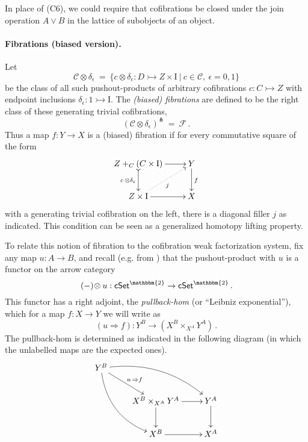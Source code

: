 \documentclass[11pt]{article}
\newcommand{\cSet}{\ensuremath{\mathsf{cSet}}}
\newcommand{\mono}{\ensuremath{\rightarrowtail}}
\newcommand{\I}{\ensuremath{\mathrm{I}}}
\newtheorem{proposition}[theorem]{Proposition}
\theoremstyle{remark}
\theoremstyle{definition}
\begin{document}
In place of (C6), we could require that cofibrations be closed under the join operation $A\vee B$ in the lattice of subobjects of an object.

\paragraph{Fibrations (biased version).}
Let 
\[
\mathcal{C}\otimes \delta_\epsilon\ =\ \{ c \otimes \delta_\epsilon : D \mono Z \times \I\ |\ c \in\mathcal{C},\ \epsilon = 0,1 \}
\]
be the class of all such pushout-products of arbitrary cofibrations $c : C \mono Z$ with endpoint inclusions $\delta_\epsilon : 1 \mono \I$.
The \emph{(biased) fibrations} are defined to be the right class of these generating trivial cofibrations,
\[
(\mathcal{C}\otimes \delta_\epsilon)^\pitchfork\ =\ \mathcal{F}\,.
\]
Thus a map $f : Y\to X$ is a (biased) fibration if for every commutative square of the form
\begin{equation}\label{diagram:biasedfillers}
\xymatrix{
Z +_C (C\times\I) \ar@{>->}[d]_{c\, \otimes \delta_\epsilon} \ar[r] & Y \ar[d]^f \\
Z\times \I \ar@{.>}[ru]_{j} \ar[r] & X
}
\end{equation}
with a generating trivial cofibration on the left, there is a diagonal filler $j$ as indicated. This condition can be seen as a generalized homotopy lifting property.

To relate this notion of fibration to the cofibration weak factorization system, fix any map $u : A \to B$, and recall (e.g. from \cite{R}) that the pushout-product with $u$ is a functor on the arrow category 
\[
(-)\!\otimes u : \cSet^\mathbbm{2} \to\cSet^\mathbbm{2}\,.
\]
This functor has a right adjoint, the \emph{pullback-hom} (or ``Leibniz exponential''), which for a map $f : X\to Y$ we will write as
\[
(u \Rightarrow\! f) : Y^B \to (X^B \times_{X^A} Y^A) \,.
\]
The pullback-hom is determined as indicated in the following diagram (in which the unlabelled maps are the expected ones).
\begin{equation}\label{diagram:pullbackhom}
\xymatrix{
Y^B \ar@/_4ex/ [rdd] \ar[rd]^{u\, \Rightarrow f} \ar@/^4ex/ [rrd] && \\
& X^B \times_{X^A} Y^A \ar[d] \ar[r] & Y^A \ar[d] \\
& X^B \ar[r] &  X^A 
}
\end{equation}
\end{document}
